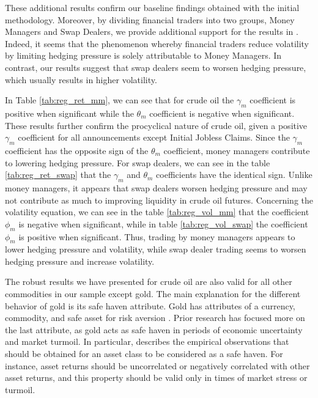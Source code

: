 \documentclass[12pt]{article}
\begin{document}
 
These additional results confirm our baseline findings obtained with the initial methodology. Moreover, by dividing financial traders into two groups, Money Managers and Swap Dealers, we provide additional support for the results in \citet{brunetti2016speculators}. Indeed, it seems that the phenomenon whereby financial traders reduce volatility by limiting hedging pressure is solely attributable to Money Managers. In contrast, our results suggest that swap dealers seem to worsen hedging pressure, which usually results in higher volatility.

 
In Table \ref{tab:reg_ret_mm}, we can see that for crude oil the  $\gamma_m$ coefficient is positive when significant while the  $\theta_m$ coefficient is negative when significant. These results further confirm the procyclical nature of crude oil, given a positive $\gamma_m$ coefficient for all announcements except Initial Jobless Claims. Since the $\gamma_m$ coefficient has the opposite sign of the $\theta_m$ coefficient, money managers contribute to lowering hedging pressure. For swap dealers, we can see in the table \ref{tab:reg_ret_swap} that the $\gamma_m$ and $\theta_m$ coefficients  have the identical sign.  Unlike  money managers, it appears that swap dealers worsen hedging pressure and may not contribute as much to improving liquidity in crude oil futures. Concerning the volatility equation, we can see in the table \ref{tab:reg_vol_mm} that the coefficient $\phi_m$ is negative when significant, while in table \ref{tab:reg_vol_swap} the coefficient $\phi_m$ is positive when significant. Thus, trading by money managers appears to lower hedging pressure and volatility, while swap dealer trading seems to worsen hedging pressure and increase volatility.%

The robust results we have presented for crude oil are also valid for all other commodities in our sample except gold. The main explanation for the different behavior of gold is its safe haven attribute. Gold has attributes of a currency,  commodity, and safe asset for risk aversion \citep{wu2019does}. Prior research has focused more on the last attribute, as gold acts as safe haven in periods of economic uncertainty and market turmoil.  In particular, \citet{baur2010gold} describes the empirical observations that should be obtained for an asset class to be considered as a safe haven. For instance, asset returns should be uncorrelated or negatively correlated with other asset returns, and this property should be valid only in times of market stress or turmoil. 
\end{document}
